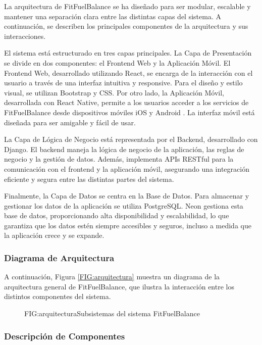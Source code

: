 La arquitectura de FitFuelBalance se ha diseñado para ser modular, escalable y mantener una separación clara entre las distintas capas del sistema. A continuación, se describen los principales componentes de la arquitectura y sus interacciones.

El sistema está estructurado en tres capas principales. La Capa de Presentación se divide en dos componentes: el Frontend Web y la Aplicación Móvil. El Frontend Web, desarrollado utilizando React, se encarga de la interacción con el usuario a través de una interfaz intuitiva y responsive. Para el diseño y estilo visual, se utilizan Bootstrap y CSS. Por otro lado, la Aplicación Móvil, desarrollada con React Native, permite a los usuarios acceder a los servicios de FitFuelBalance desde dispositivos móviles iOS \cite{iOS} y Android \cite{Android}. La interfaz móvil está diseñada para ser amigable y fácil de usar.

La Capa de Lógica de Negocio está representada por el Backend, desarrollado con Django. El backend maneja la lógica de negocio de la aplicación, las reglas de negocio y la gestión de datos. Además, implementa APIs RESTful \cite{RESTfulAPI} para la comunicación con el frontend y la aplicación móvil, asegurando una integración eficiente y segura entre las distintas partes del sistema.

Finalmente, la Capa de Datos se centra en la Base de Datos. Para almacenar y gestionar los datos de la aplicación se utiliza PostgreSQL. Neon gestiona esta base de datos, proporcionando alta disponibilidad y escalabilidad, lo que garantiza que los datos estén siempre accesibles y seguros, incluso a medida que la aplicación crece y se expande.

\subsubsection{Diagrama de Arquitectura}
A continuación, Figura \ref{FIG:arquitectura} muestra un diagrama de la arquitectura general de FitFuelBalance, que ilustra la interacción entre los distintos componentes del sistema.
\begin{figure}[Distribución Arquitectura]{FIG:arquitectura}{Subsistemas del sistema FitFuelBalance}
\end{figure}

\subsubsection{Descripción de Componentes}

